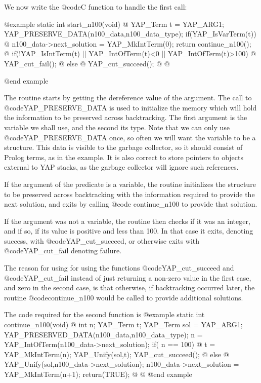 {{{{{{{{{We now write the @code{C} function to handle the first call:

@example
static int start_n100(void)
@{
      YAP_Term t = YAP_ARG1;
      YAP_PRESERVE_DATA(n100_data,n100_data_type);
      if(YAP_IsVarTerm(t)) @{
          n100_data->next_solution = YAP_MkIntTerm(0);
          return continue_n100();
       @}
      if(!YAP_IsIntTerm(t) || YAP_IntOfTerm(t)<0 || YAP_IntOfTerm(t)>100) @{
          YAP_cut_fail();
      @} else @{
          YAP_cut_succeed();
      @}
@}

@end example

The routine starts by getting the dereference value of the argument.
The call to @code{YAP_PRESERVE_DATA} is used to initialize the memory
which will hold the information to be preserved across
backtracking. The first argument is the variable we shall use, and the
second its type. Note that we can only use @code{YAP_PRESERVE_DATA}
once, so often we will want the variable to be a structure. This data
is visible to the garbage collector, so it should consist of Prolog
terms, as in the example. It is also correct to store pointers to
objects external to YAP stacks, as the garbage collector will ignore
such references.

If the argument of the predicate is a variable, the routine initializes the 
structure to be preserved across backtracking with the information
required to provide the next solution, and exits by calling @code{
continue_n100} to provide that solution.

If the argument was not a variable, the routine then checks if it was an
integer, and if so, if its value is positive and less than 100. In that
case it exits, denoting success, with @code{YAP_cut_succeed}, or
otherwise exits with @code{YAP_cut_fail} denoting failure.

The reason for using for using the functions @code{YAP_cut_succeed} and
@code{YAP_cut_fail} instead of just returning a non-zero value in the
first case, and zero in the second case, is that otherwise, if
backtracking occurred later, the routine @code{continue_n100} would be
called to provide additional solutions.

The code required for the second function is
@example
static int continue_n100(void)
@{
      int n;
      YAP_Term t;
      YAP_Term sol = YAP_ARG1;
      YAP_PRESERVED_DATA(n100_data,n100_data_type);
      n = YAP_IntOfTerm(n100_data->next_solution);
      if( n == 100) @{
           t = YAP_MkIntTerm(n);
           YAP_Unify(sol,t);
           YAP_cut_succeed();
        @}
       else @{
           YAP_Unify(sol,n100_data->next_solution);
           n100_data->next_solution = YAP_MkIntTerm(n+1);
           return(TRUE);
        @}
@}
@end example

}}}}}}}}}
